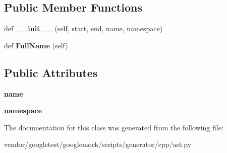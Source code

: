 \subsection*{Public Member Functions}
\begin{DoxyCompactItemize}
\item 
\mbox{\label{classcpp_1_1ast_1_1___generic_declaration_afde72751e20708a7802eb7707d23bc3c}} 
def {\bfseries \+\_\+\+\_\+init\+\_\+\+\_\+} (self, start, end, name, namespace)
\item 
\mbox{\label{classcpp_1_1ast_1_1___generic_declaration_a1437d31271ea8cda62da22e2ce427a85}} 
def {\bfseries Full\+Name} (self)
\end{DoxyCompactItemize}
\subsection*{Public Attributes}
\begin{DoxyCompactItemize}
\item 
\mbox{\label{classcpp_1_1ast_1_1___generic_declaration_af774f4729dfd78d0538a6782fe8514c1}} 
{\bfseries name}
\item 
\mbox{\label{classcpp_1_1ast_1_1___generic_declaration_a8aee3f11b37449d54b42a78e0a689f46}} 
{\bfseries namespace}
\end{DoxyCompactItemize}


The documentation for this class was generated from the following file\+:\begin{DoxyCompactItemize}
\item 
vendor/googletest/googlemock/scripts/generator/cpp/ast.\+py\end{DoxyCompactItemize}
